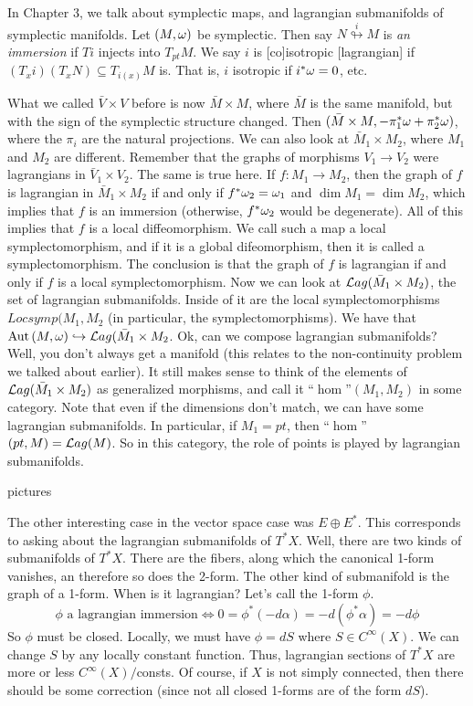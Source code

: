 In Chapter 3, we talk about symplectic maps, and
 lagrangian submanifolds of symplectic manifolds.  Let $(M,\omega)$ be
 symplectic. Then say $N \stackrel{i}{\looparrowright} M$ is \emph{an
 immersion} if $Ti$ injects into $T_{pt}M$.  We say $i$ is
 [co]isotropic [lagrangian] if $(T_xi)(T_xN)\subseteq T_{i(x)}M$
 is.  That is, $i$ isotropic if $i^*\omega=0$, etc.

 What we called $\bar V\times V$ before is now $\bar M\times M$,
 where $\bar M$ is the same manifold, but with the sign of the
 symplectic structure changed.  Then $(\bar M\times
 M,-\pi^*_1\omega+\pi^*_2\omega)$, where the $\pi_i$ are the natural
 projections.  We can also look at $\bar M_1\times M_2$, where
 $M_1$ and $M_2$ are different.  Remember that the graphs of
 morphisms $V_1\to V_2$ were lagrangians in $\bar V_1\times V_2$.
 The same is true here.  If $f:M_1\to M_2$, then the graph of $f$
 is lagrangian in $\bar M_1\times M_2$ if and only if
 $f^*\omega_2=\omega_1$ and $\dim M_1=\dim M_2$, which implies that $f$ is
 an immersion (otherwise, $f^*\omega_2$ would be degenerate).  All of
 this implies that $f$ is a local diffeomorphism.  We call such a
 map a local symplectomorphism, and if it is a global
 difeomorphism, then it is called a symplectomorphism.  The
 conclusion is that the graph of $f$ is lagrangian if and only if
 $f$ is a local symplectomorphism.  Now we can look at $\mathcal{L}ag(\bar
 M_1\times M_2)$, the set of lagrangian submanifolds.  Inside of
 it are the local symplectomorphisms $Locsymp(M_1,M_2$ (in
 particular, the symplectomorphisms).  We have that $\text{\rm Aut}\, (M,\omega)
 \hookrightarrow \mathcal{L}ag(\bar M_1\times M_2$.  Ok, can we compose
 lagrangian submanifolds?  Well, you don't always get a manifold
 (this relates to the non-continuity problem we talked about
 earlier).  It still makes sense to think of the elements of
 $\mathcal{L}ag(\bar M_1\times M_2)$ as generalized morphisms, and call it
 ``$\hom$''$(M_1,M_2)$ in some category.  Note that even if the
 dimensions don't match, we can have some lagrangian submanifolds.
 In particular, if $M_1=pt$, then ``$\hom$''$(pt,M)=\mathcal{L}ag(M)$.  So in
 this category, the role of points is played by lagrangian
 submanifolds.

 pictures

 The other interesting case in the vector space case was $E\oplus
 E^*$.  This corresponds to asking about the lagrangian
 submanifolds of $T^*X$.  Well, there are two kinds of
 submanifolds of $T^*X$. There are the fibers, along which the
 canonical 1-form vanishes, an therefore so does the 2-form.  The
 other kind of submanifold is the graph of a 1-form.  When is it
 lagrangian?  Let's call the 1-form $\phi$.
 \[
   \phi \text{ a lagrangian immersion} \Leftrightarrow
   0=\phi^*(-d\alpha) = -d(\phi^*\alpha) = -d\phi
 \]
 So $\phi$ must be closed.  Locally, we must have $\phi = dS$
 where $S\in C^{\infty}(X)$.  We can change $S$ by any locally
 constant function.  Thus, lagrangian sections of $T^*X$ are more
 or less $C^{\infty}(X)/$consts.  Of course, if $X$ is not simply
 connected, then there should be some correction (since not all
 closed 1-forms are of the form $dS$).

